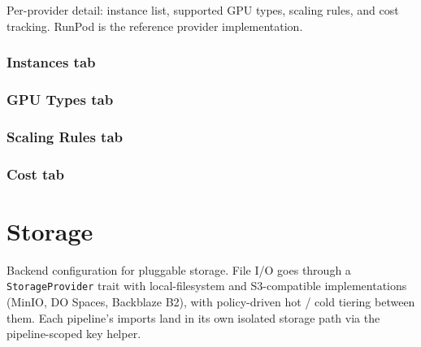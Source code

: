 Per-provider detail: instance list, supported GPU types, scaling rules, and
cost tracking. RunPod is the reference provider implementation.


\begin{itemize}
\end{itemize}

\subsubsection{Instances tab}

\subsubsection{GPU Types tab}

\subsubsection{Scaling Rules tab}

\subsubsection{Cost tab}

\section{Storage}
\label{sec:admin-storage}

Backend configuration for pluggable storage. File I/O goes through a
\texttt{StorageProvider} trait with local-filesystem and S3-compatible
implementations (MinIO, DO Spaces, Backblaze B2), with policy-driven hot / cold
tiering between them. Each pipeline's imports land in its own isolated storage
path via the pipeline-scoped key helper.


